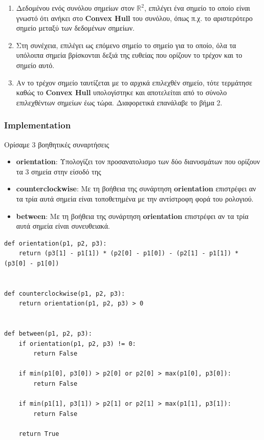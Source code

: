 \documentclass[12pt]{article}
\newcommand{\R}{\mathbb{R}}
\begin{document}
\begin{enumerate}
    \item Δεδομένου ενός συνόλου σημείων στον \( \R^2 \),
    επιλέγει ένα σημείο το οποίο είναι γνωστό ότι
    ανήκει στο \textbf{Convex Hull} του συνόλου,
    όπως π.χ. το αριστερότερο σημείο μεταξύ των δεδομένων σημείων.

    \item Στη συνέχεια, επιλέγει ως επόμενο σημείο το σημείο για το οποίο,
    όλα τα υπόλοιπα σημεία βρίσκονται δεξιά της ευθείας που ορίζουν
    το τρέχον και το σημείο αυτό.

    \item Αν το τρέχον σημείο ταυτίζεται με το αρχικά επιλεχθέν σημείο,
    τότε τερμάτησε καθώς το \textbf{Convex Hull} υπολογίστηκε και αποτελείται
    από το σύνολο επιλεχθέντων σημείων έως τώρα. Διαφορετικά επανάλαβε
    το βήμα 2.
\end{enumerate}

\pagebreak

\subsubsection*{Implementation}

Ορίσαμε 3 βοηθητικές συναρτήσεις

\begin{itemize}
    \item \textbf{orientation}: Υπολογίζει τον προσανατολισμο
    των δύο διανυσμάτων που ορίζουν τα 3 σημεία στην είσοδό της

    \item \textbf{counterclockwise}: Με τη βοήθεια της συνάρτηση
    \textbf{orientation} επιστρέφει αν τα τρία αυτά σημεία είναι
    τοποθετημένα με την αντίστροφη φορά του ρολογιού.

    \item \textbf{between}: Με τη βοήθεια της συνάρτηση
    \textbf{orientation} επιστρέφει αν τα τρία αυτά σημεία είναι
    συνευθειακά.
\end{itemize}

\begin{lstlisting}
def orientation(p1, p2, p3):
    return (p3[1] - p1[1]) * (p2[0] - p1[0]) - (p2[1] - p1[1]) * (p3[0] - p1[0])


def counterclockwise(p1, p2, p3):
    return orientation(p1, p2, p3) > 0


def between(p1, p2, p3):
    if orientation(p1, p2, p3) != 0:
        return False

    if min(p1[0], p3[0]) > p2[0] or p2[0] > max(p1[0], p3[0]):
        return False

    if min(p1[1], p3[1]) > p2[1] or p2[1] > max(p1[1], p3[1]):
        return False

    return True
\end{lstlisting}
\end{document}

